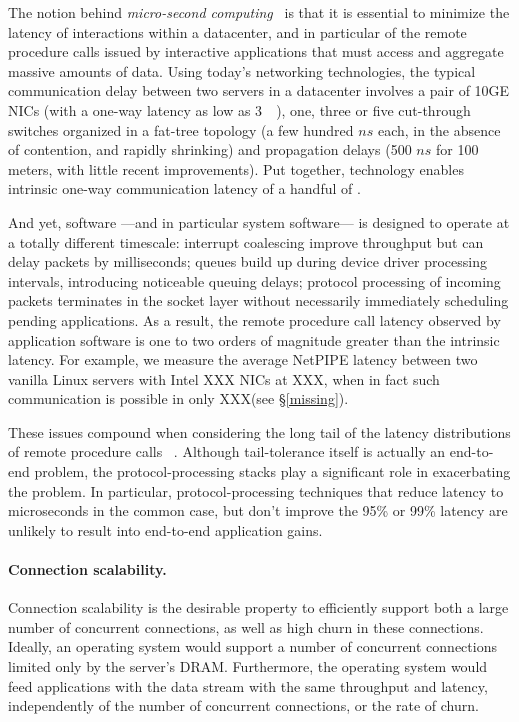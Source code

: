 The notion behind \emph{micro-second computing}~\cite{luiz-isscc} is
that it is essential to minimize the latency of interactions within a
datacenter, and in particular of the remote procedure calls issued by
interactive applications that must access and aggregate massive
amounts of data.  Using today's networking technologies, the typical
communication delay between two servers in a datacenter involves a
pair of 10GE NICs (with a one-way latency as low as
3~\microsecond~\cite{cisco-sereno}), one, three or five cut-through
switches organized in a fat-tree topology (a few hundred $ns$ each, in
the absence of contention, and rapidly shrinking) and propagation
delays (500 $ns$ for 100 meters, with little recent improvements).
Put together, technology enables intrinsic one-way communication
latency of a handful of \microsecond.  

And yet, software ---and in particular system software--- is designed
to operate at a totally different timescale: interrupt coalescing
improve throughput but can delay packets by milliseconds; queues build
up during device driver processing intervals, introducing noticeable
queuing delays; protocol processing of incoming packets terminates in
the socket layer without necessarily immediately scheduling pending
applications. As a result, the remote procedure call latency observed
by application software is one to two orders of magnitude greater than
the intrinsic latency.  For example, we measure the average NetPIPE
latency between two vanilla Linux servers with Intel XXX NICs at
XXX\microsecond, when in fact such communication is possible in only
XXX\microsecond (see \S\ref{missing}).

These issues compound when considering the long tail of the latency
distributions of remote procedure
calls~\cite{DBLP:journals/cacm/DeanB13} . Although tail-tolerance
itself is actually an end-to-end problem, the protocol-processing
stacks play a significant role in exacerbating the problem.  In
particular, protocol-processing techniques that reduce latency to
microseconds in the common case, but don't improve the 95\% or 99\%
latency are unlikely to result into end-to-end application gains.

\paragraph{Connection scalability.}

Connection scalability is the desirable property to efficiently
support both a large number of concurrent connections, as well as high
churn in these connections.  Ideally, an operating system would
support a number of concurrent connections limited only by the
server's DRAM.  Furthermore, the operating system would feed
applications with the data stream with the same throughput and
latency, independently of the number of concurrent connections, or the
rate of churn.
 
